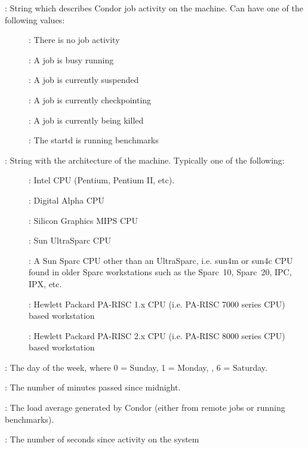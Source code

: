 \begin{description}
%
\item[\AdAttr{Activity}] : String which describes Condor job activity on the machine.
Can have one of the following values:
	\begin{description}
	\item[] : There is no job activity
	\item[] : A job is busy running
	\item[] : A job is currently suspended
	\item[] : A job is currently checkpointing
	\item[] : A job is currently being killed
	\item[] : The startd is running benchmarks
	\end{description}
%
\item[\AdAttr{Arch}] : String with the architecture of the machine.  Typically
one of the following: 
	\begin{description}
	\item[] : Intel CPU (Pentium, Pentium II, etc).
	\item[] : Digital Alpha CPU
	\item[] : Silicon Graphics MIPS CPU
	\item[] : Sun UltraSparc CPU
	\item[] : A Sun Sparc CPU other than an UltraSparc, i.e.
sun4m or sun4c CPU found in older Sparc workstations such as the Sparc~10, 
Sparc~20, IPC, IPX, etc.
	\item[] :  Hewlett Packard PA-RISC 1.x CPU (i.e. PA-RISC    
                      7000 series CPU) based workstation
	\item[] :  Hewlett Packard PA-RISC 2.x CPU (i.e. PA-RISC    
                      8000 series CPU) based workstation
	\end{description}
%
\item[\AdAttr{ClockDay}] : The day of the week, where 0 = Sunday, 1 = Monday, \Dots, 6 = Saturday. 
%
\item[\AdAttr{ClockMin}] : The number of minutes passed since midnight.
%
\item[\AdAttr{CondorLoadAvg}] : The load average generated by Condor (either
from remote jobs or running benchmarks).
%
\item[\AdAttr{ConsoleIdle}] : The number of seconds since activity on the system

\end{description}

